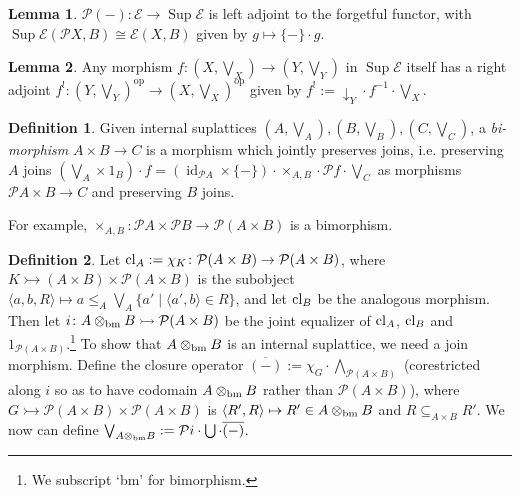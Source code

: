 \documentclass{article}
\theoremstyle{definition}
\newtheorem{definition}{Definition}[section]
\newtheorem{lemma}{Lemma}[section]
\newcommand{\cE}{\mathcal{E}}
\newcommand{\cP}{\mathcal{P}}
\newcommand{\op}{\operatorname{op}}
\newcommand{\id}{\operatorname{id}}
\newcommand{\Sup}{\operatorname{Sup}}
\begin{document}
\begin{lemma}
    \label{lemma:freepower}
    $\cP(-)\colon\cE\to\Sup\cE$ is left adjoint to the forgetful functor, with $\Sup\cE(\cP X,B)\cong\cE(X,B)$ given by $g\mapsto\{-\}\cdot g$. 

\end{lemma}


\begin{lemma}
    \label{lemma:supadj}
    Any morphism $f\colon (X,\bigvee_X)\to (Y,\bigvee_Y)$ in $\Sup \cE$ itself has a right adjoint $f^!\colon (Y,\bigvee_Y)^{\op}\to (X,\bigvee_X)^{\op}$ given by $f^!:=\downarrow_Y\cdot f^{-1}\cdot \bigvee_X$. 
\end{lemma}


\begin{definition}
    Given internal suplattices $(A,\bigvee_A),(B,\bigvee_B),(C,\bigvee_C)$, a {\it bi-morphism} $A\times B \to C$ is a morphism which jointly preserves joins, i.e. preserving $A$ joins $(\bigvee_A \times 1_B) \cdot f  = (\id_{\cP A}\times \{-\})\cdot\times_{A,B}\cdot \cP f \cdot \bigvee_C$ as morphisms $\cP A \times B \to C$ and preserving $B$ joins.
\end{definition}

For example, $\times_{A,B}\colon \cP A\times \cP B \to \cP (A\times B)$ is a bimorphism.


\begin{definition}
    \label{def:tensor}
    Let ${\rm cl}_A:=\chi_K\colon\cP(A\times B)\to\cP(A\times B)$, where
    $K\rightarrowtail(A\times B)\times\cP(A\times B)$ is the subobject $\langle a,b,R\rangle\mapsto a\le_A\bigvee_A\{a'\mid\langle a',b\rangle\in R\}$,
    and let ${\rm cl}_B$ be the analogous morphism. Then let $ i\colon A\otimes_{\rm bm}B\rightarrowtail\cP(A\times B)$ be the joint equalizer of
    ${\rm cl}_A$, ${\rm cl}_B$ and $1_{\cP(A\times B)}$.\footnote{We subscript `bm' for bimorphism.} To show that $A\otimes_{\rm bm}B$ is an internal suplattice, we need a join morphism.
    Define the closure operator $\overline{(-)}:=\chi_G\cdot\bigwedge_{\cP(A\times B)}$ (corestricted along $ i$ so as to have codomain $A \otimes_{\rm bm} B$ rather than $\cP(A \times B)$), where
    $G\rightarrowtail\cP(A\times B)\times\cP(A\times B)$ is $\langle R',R\rangle \mapsto R'\in A\otimes_{\rm bm}B$ and $R\subseteq_{A\times B}R'$. We now can define $\bigvee_{A\otimes_{\rm bm}B}:=\cP i\cdot\bigcup\cdot\overline{(-)}$. 
   
\end{definition}
\end{document}
